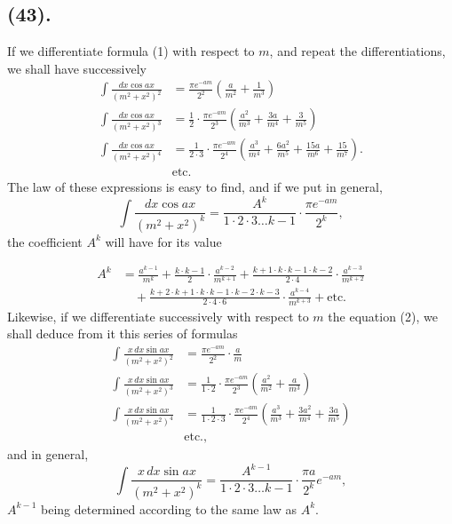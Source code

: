 \documentclass{article}
\begin{document}
\subsection*{(43).}

If we differentiate formula (1) with respect to $m$, and repeat the differentiations, we shall have successively
\[ \begin{aligned} \int\frac{dx\cos ax}{(m^{2}+x^{2})^{2}}&=\frac{\pi e^{-am}}{2^{2}}\left(\frac{a}{m^{2}}+\frac{1}{m^{3}}\right)\\ \int\frac{dx\cos ax}{(m^{2}+x^{2})^{3}}&=\frac{1}{2}\cdot\frac{\pi e^{-am}}{2^{3}}\left(\frac{a^{2}}{m^{3}}+\frac{3a}{m^{4}}+\frac{3}{m^{5}}\right)\\ \int\frac{dx\cos ax}{(m^{2}+x^{2})^{4}}&=\frac{1}{2\cdot3}\cdot\frac{\pi e^{-am}}{2^{4}}\left(\frac{a^{3}}{m^{4}}+\frac{6a^{2}}{m^{5}}+\frac{15a}{m^{6}}+\frac{15}{m^{7}}\right).\\ &\text{etc.} \end{aligned} \]
The law of these expressions is easy to find, and if we put in general,
\[ \int\frac{dx\cos ax}{(m^{2}+x^{2})^{k}}=\frac{A^{k}}{1\cdot2\cdot3\ldots k-1}\cdot\frac{\pi e^{-am}}{2^{k}}, \tag{3} \]
the coefficient $A^{k}$ will have for its value

\[ \begin{aligned} A^{k}&=\frac{a^{k-1}}{m^{k}}+\frac{k\cdot k-1}{2}\cdot\frac{a^{k-2}}{m^{k+1}}+\frac{k+1\cdot k\cdot k-1\cdot k-2}{2\cdot4}\cdot\frac{a^{k-3}}{m^{k+2}}\\ &\quad+\frac{k+2\cdot k+1\cdot k\cdot k-1\cdot k-2\cdot k-3}{2\cdot4\cdot6}\cdot\frac{a^{k-4}}{m^{k+3}}+\text{etc.} \end{aligned} \]
Likewise, if we differentiate successively with respect to $m$ the equation (2), we shall deduce from it this series of formulas
\[ \begin{aligned} \int\frac{x\,dx\sin ax}{(m^{2}+x^{2})^{2}}&=\frac{\pi e^{-am}}{2^{2}}\cdot\frac{a}{m}\\ \int\frac{x\,dx\sin ax}{(m^{2}+x^{2})^{3}}&=\frac{1}{1\cdot2}\cdot\frac{\pi e^{-am}}{2^{3}}\left(\frac{a^{2}}{m^{2}}+\frac{a}{m^{3}}\right)\\ \int\frac{x\,dx\sin ax}{(m^{2}+x^{2})^{4}}&=\frac{1}{1\cdot2\cdot3}\cdot\frac{\pi e^{-am}}{2^{4}}\left(\frac{a^{3}}{m^{3}}+\frac{3a^{2}}{m^{4}}+\frac{3a}{m^{5}}\right)\\ &\text{etc.}, \end{aligned} \]
and in general,
\[ \int\frac{x\,dx\sin ax}{(m^{2}+x^{2})^{k}}=\frac{A^{k-1}}{1\cdot2\cdot3\ldots k-1}\cdot\frac{\pi a}{2^{k}}e^{-am}, \tag{4} \]
$A^{k-1}$ being determined according to the same law as $A^{k}$.
\end{document}
